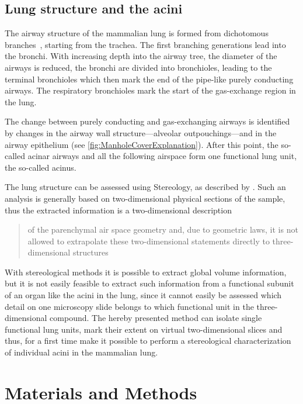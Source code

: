 \documentclass[a4paper,DIVcalc,abstract,english]{scrartcl}
\begin{document}
\subsection{Lung structure and the acini}
The airway structure of the mammalian lung is formed from dichotomous branches~\cite{Weibel1991}, starting from the trachea.
The first branching generations lead into the bronchi.
With increasing depth into the airway tree, the diameter of the airways is reduced, the bronchi are divided into bronchioles, leading to the terminal bronchioles which then mark the end of the pipe-like purely conducting airways.
The respiratory bronchioles mark the start of the gas-exchange region in the lung.

The change between purely conducting and gas-exchanging airways is identified by changes in the airway wall structure---alveolar outpouchings---and in the airway epithelium (see \autoref{fig:ManholeCoverExplanation}).
After this point, the so-called acinar airways and all the following airspace form one functional lung unit, the so-called acinus.

The lung structure can be assessed using Stereology, as described by \citet{Hsia2010}.
Such an analysis is generally based on two-dimensional physical sections of the sample, thus the extracted information is a two-dimensional description \blockquote[\citet{Tschanz2002}]{of the parenchymal air space geometry and, due to geometric laws, it is not allowed to extrapolate these two-dimensional statements directly to three-dimensional structures}.
With stereological methods it is possible to extract global volume information, but it is not easily feasible to extract such information from a functional subunit of an organ like the acini in the lung, since it cannot easily be assessed which detail on one microscopy slide belongs to which functional unit in the three-dimensional compound.
The hereby presented method can isolate single functional lung units, mark their extent on virtual two-dimensional slices and thus, for a first time make it possible to perform a stereological characterization of individual acini in the mammalian lung.

\section{Materials and Methods\label{sec:materials and methods}}
\end{document}

